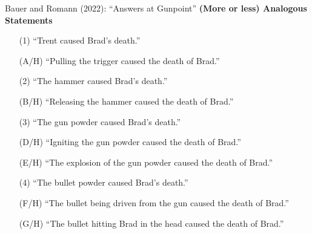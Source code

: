 \documentclass[xcolor=table,9pt,aspectratio=169]{beamer}
\begin{document}
\begin{frame}{\vspace*{10mm}Bauer and Romann (2022): ``Answers at Gunpoint''}
\vspace*{-5mm}
\textbf{(More or less) Analogous Statements}\\
\begin{itemize}
   \item[(1)] ``Trent caused Brad's death.''
   \item[(A/H)] ``Pulling the trigger caused the death of Brad.''
\end{itemize}
\vspace*{0.5em}
\begin{itemize}
   \item[(2)] ``The hammer caused Brad's death.''
   \item[(B/H)] ``Releasing the hammer caused the death of Brad.''
\end{itemize}
\vspace*{0.5em}
\begin{itemize}
   \item[(3)] ``The gun powder caused Brad's death.''
   \item[(D/H)] ``Igniting the gun powder caused the death of Brad.''
   \item[(E/H)] ``The explosion of the gun powder caused the death of Brad.''
\end{itemize}
\vspace*{0.5em}
\begin{itemize}
   \item[(4)] ``The bullet powder caused Brad's death.''
   \item[(F/H)] ``The bullet being driven from the gun caused the death of Brad.''
   \item[(G/H)] ``The bullet hitting Brad in the head caused the death of Brad.''
\end{itemize}
\end{frame}
\end{document}
